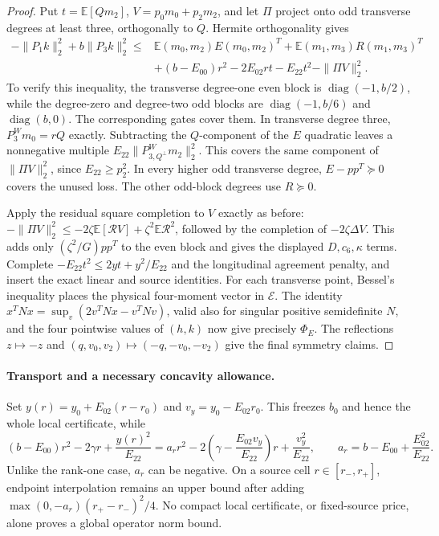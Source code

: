 \begin{proof}
Put $t=\mathbb E[Qm_2]$, $V=p_0m_0+p_2m_2$, and let $\Pi$
project onto odd transverse degrees at least three, orthogonally to
$Q$.  Hermite orthogonality gives
\begin{align*}
 -\|P_1k\|_2^2+b\|P_3k\|_2^2\leq{}&
 \mathbb E(m_0,m_2)E(m_0,m_2)^T+
 \mathbb E(m_1,m_3)R(m_1,m_3)^T\\
 &+(b-E_{00})r^2-2E_{02}rt-E_{22}t^2
 -\|\Pi V\|_2^2.
\end{align*}
To verify this inequality, the transverse degree-one even block is
$\operatorname{diag}(-1,b/2)$, while the degree-zero and degree-two
odd blocks are $\operatorname{diag}(-1,b/6)$ and
$\operatorname{diag}(b,0)$.  The corresponding gates cover them.
In transverse degree three, $P_3^Wm_0=rQ$ exactly.  Subtracting the
$Q$-component of the $E$ quadratic leaves a nonnegative multiple
$E_{22}\|P_{3,Q^\perp}^Wm_2\|_2^2$.  This covers the same component
of $\|\Pi V\|_2^2$, since $E_{22}\geq p_2^2$.
In every higher odd transverse degree, $E-pp^T\succeq0$ covers
the unused loss.  The other odd-block degrees use $R\succeq0$.

Apply the residual square completion to $V$ exactly as before:
$-\|\Pi V\|_2^2\leq-2\zeta\mathbb E[\mathcal RV]
+\zeta^2\mathbb E\mathcal R^2$, followed by the completion of
$-2\zeta\Delta V$.  This adds only $(\zeta^2/G)pp^T$ to the
even block and gives the displayed $D,c_6,\kappa$ terms.
Complete $-E_{22}t^2\leq2yt+y^2/E_{22}$ and the longitudinal
agreement penalty, and insert the exact linear and source identities.
For each transverse point, Bessel's inequality places the physical
four-moment vector in $\mathcal E$.
The identity $x^TNx=\sup_v(2v^TNx-v^TNv)$, valid also for
singular positive semidefinite $N$, and the four pointwise values of
$(h,k)$ now give precisely $\Phi_E$.
The reflections $z\mapsto-z$ and
$(q,v_0,v_2)\mapsto(-q,-v_0,-v_2)$ give the final symmetry claims.
\end{proof}

\paragraph{Transport and a necessary concavity allowance.}
Set $y(r)=y_0+E_{02}(r-r_0)$ and $v_y=y_0-E_{02}r_0$.
This freezes $b_0$ and hence the whole local certificate, while
\[
 (b-E_{00})r^2-2\gamma r+\frac{y(r)^2}{E_{22}}
 =a_r r^2-2\left(\gamma-\frac{E_{02}v_y}{E_{22}}\right)r
                +\frac{v_y^2}{E_{22}},\qquad
 a_r=b-E_{00}+\frac{E_{02}^2}{E_{22}}.
\]
Unlike the rank-one case, $a_r$ can be negative.  On a source cell
$r\in[r_-,r_+]$, endpoint interpolation remains an upper bound after
adding $\max(0,-a_r)(r_+-r_-)^2/4$.
No compact local certificate, or fixed-source price, alone proves a
global operator norm bound.
